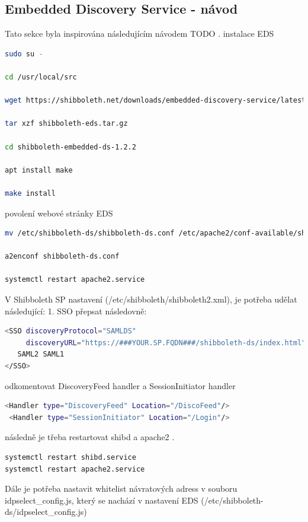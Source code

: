 \subsection{Embedded Discovery Service - návod}
Tato sekce byla inspirována následujícím návodem TODO .
instalace EDS
\begin{lstlisting}[language=Bash]
  sudo su -

cd /usr/local/src

wget https://shibboleth.net/downloads/embedded-discovery-service/latest/shibboleth-embedded-ds-1.2.2.tar.gz -O shibboleth-eds.tar.gz

tar xzf shibboleth-eds.tar.gz

cd shibboleth-embedded-ds-1.2.2

apt install make

make install
\end{lstlisting}

povolení webové stránky EDS

\begin{lstlisting}[language=Bash]
mv /etc/shibboleth-ds/shibboleth-ds.conf /etc/apache2/conf-available/shibboleth-ds.conf

a2enconf shibboleth-ds.conf

systemctl restart apache2.service
\end{lstlisting}

V Shibboleth SP nastavení (/etc/shibboleth/shibboleth2.xml), je potřeba udělat následující:
1. SSO přepsat následovně:

\begin{lstlisting}[language=Bash]
<SSO discoveryProtocol="SAMLDS" 
     discoveryURL="https://###YOUR.SP.FQDN###/shibboleth-ds/index.html">
   SAML2 SAML1
</SSO>
\end{lstlisting}

odkomentovat DiscoveryFeed handler a SessionInitiator handler

\begin{lstlisting}[language=Bash]
<Handler type="DiscoveryFeed" Location="/DiscoFeed"/>
 <Handler type="SessionInitiator" Location="/Login"/>
\end{lstlisting}

následně je třeba restartovat shibd a apache2 .

\begin{lstlisting}[language=Bash]
systemctl restart shibd.service
systemctl restart apache2.service
\end{lstlisting}

Dále je potřeba nastavit whitelist návratových adress v souboru idpselect_config.js, který se nachází v nastavení EDS (/etc/shibboleth-ds/idpselect_config.js)

